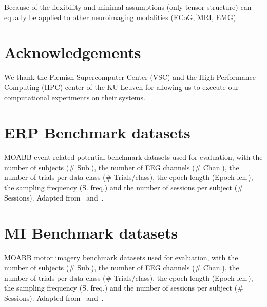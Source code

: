 \documentclass[twocolumn]{article}
\begin{document}
Because of the flexibility and minimal assumptions (only tensor structure)
can equally be applied to other neuroimaging modalities (ECoG,fMRI, EMG)

\printbibliography

\section*{Acknowledgements}
We thank the Flemish Supercomputer Center (VSC) and the High-Performance
Computing (HPC) center of the KU Leuven for allowing us to execute our
computational experiments on their systems.

\clearpage
\appendix

\onecolumn
{}
\section{ERP Benchmark datasets}
\begin{table*}[htp]
  
  \caption{MOABB event-related potential benchmark datasets used for evaluation, with the number of
  subjects (\# Sub.), the number of EEG channels (\# Chan.), the number of trials
per data class (\# Trials/class), the epoch length (Epoch len.), the sampling
frequency (S. freq.) and the number of sessions per subject (\# Sessions).
Adapted from~\cite{Aristimunha2023} and~\cite{Chevallier2024}.}
  \label{tab:moabb-erp}
\end{table*}

\section{MI Benchmark datasets}
\begin{table*}[htp]
  \caption{MOABB motor imagery benchmark datasets used for evaluation, with the number of
  subjects (\# Sub.), the number of EEG channels (\# Chan.), the number of trials
per data class (\# Trials/class), the epoch length (Epoch len.), the sampling
frequency (S. freq.) and the number of sessions per subject (\# Sessions).
Adapted from~\cite{Aristimunha2023} and~\cite{Chevallier2024}.}
  \label{tab:moabb-mi}
\end{table*}
\end{document}
